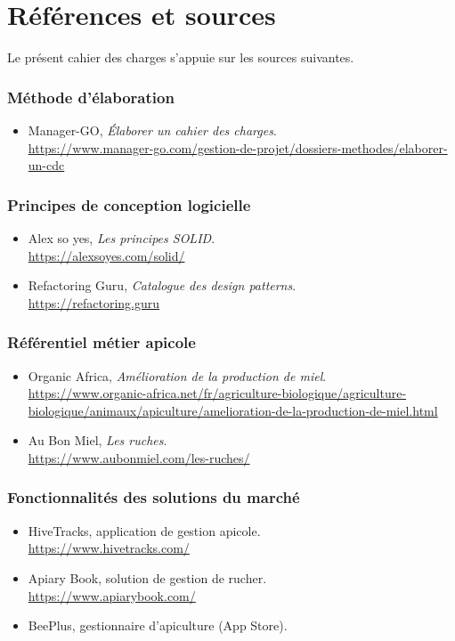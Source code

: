 \chapter{Références et sources}
Le présent cahier des charges s'appuie sur les sources suivantes.

\subsection*{Méthode d'élaboration}
\begin{itemize}
  \item Manager-GO, \emph{Élaborer un cahier des charges}.\\ \url{https://www.manager-go.com/gestion-de-projet/dossiers-methodes/elaborer-un-cdc}
\end{itemize}

\subsection*{Principes de conception logicielle}
\begin{itemize}
  \item Alex so yes, \emph{Les principes SOLID}.\\ \url{https://alexsoyes.com/solid/}
  \item Refactoring Guru, \emph{Catalogue des design patterns}.\\ \url{https://refactoring.guru}
\end{itemize}

\subsection*{Référentiel métier apicole}
\begin{itemize}
  \item Organic Africa, \emph{Amélioration de la production de miel}.\\ \url{https://www.organic-africa.net/fr/agriculture-biologique/agriculture-biologique/animaux/apiculture/amelioration-de-la-production-de-miel.html}
  \item Au Bon Miel, \emph{Les ruches}.\\ \url{https://www.aubonmiel.com/les-ruches/}
\end{itemize}

\subsection*{Fonctionnalités des solutions du marché}
\begin{itemize}
  \item HiveTracks, application de gestion apicole.\\ \url{https://www.hivetracks.com/}
  \item Apiary Book, solution de gestion de rucher.\\ \url{https://www.apiarybook.com/}
  \item BeePlus, gestionnaire d'apiculture (App Store).
\end{itemize}

